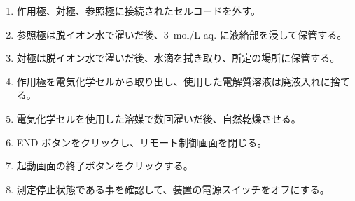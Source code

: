 \begin{enumerate}
    \item 作用極、対極、参照極に接続されたセルコードを外す。
    \item 参照極は脱イオン水で濯いだ後、\SIlist{3}{\mole/\liter}  aq. に液絡部を浸して保管する。
    \item 対極は脱イオン水で濯いだ後、水滴を拭き取り、所定の場所に保管する。
    \item 作用極を電気化学セルから取り出し、使用した電解質溶液は廃液入れに捨てる。
    \item 電気化学セルを使用した溶媒で数回濯いだ後、自然乾燥させる。
    \item END ボタンをクリックし、リモート制御画面を閉じる。
    \item 起動画面の終了ボタンをクリックする。
    \item 測定停止状態である事を確認して、装置の電源スイッチをオフにする。
\end{enumerate}
